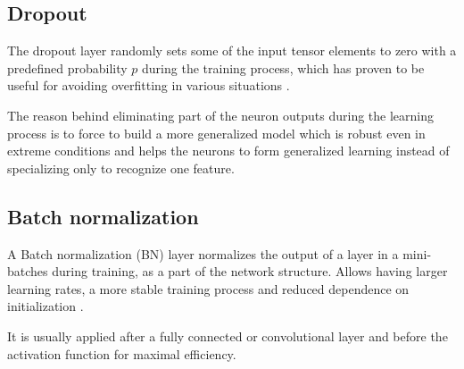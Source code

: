 \subsection{Dropout}
The dropout layer randomly sets some of the input tensor elements to zero with a predefined probability $p$ during the training process, which has proven to be useful for avoiding overfitting in various situations \cite{dropout_effect}.

The reason behind eliminating part of the neuron outputs during the learning process is to force to build a more generalized model which is robust even in extreme conditions and helps the neurons to form generalized learning instead of specializing only to recognize one feature.

\subsection{Batch normalization}


A Batch normalization (BN) layer normalizes the output of a layer in a mini-batches during training, as a part of the network structure. Allows having larger learning rates, a more stable training process and reduced dependence on initialization \cite{ioffe2015batch}.

It is usually applied after a fully connected or convolutional layer and before the activation function for maximal efficiency.








